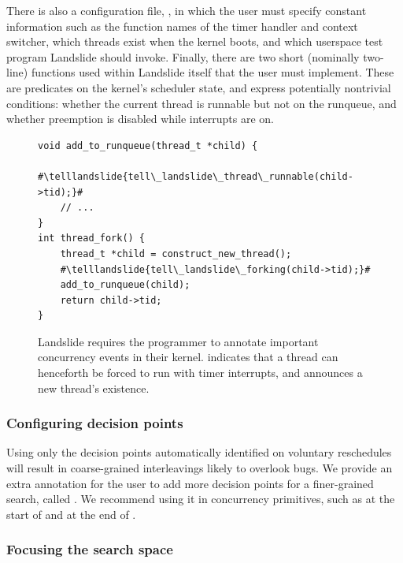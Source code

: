 There is also a configuration file, , in which the user must specify constant information such as the function names of the timer handler and context switcher, which threads exist when the kernel boots, and which userspace test program Landslide should invoke.
Finally, there are two short (nominally two-line) functions used within Landslide itself that the user must implement. These are predicates on the kernel's scheduler state, and express potentially nontrivial conditions: whether the current thread is runnable but not on the runqueue, and whether preemption is disabled while interrupts are on.

\newcommand\telllandslide[1]{\bfseries \color{violet}{#1}}
\begin{figure}[t]
\small
\begin{lstlisting}
void add_to_runqueue(thread_t *child) {
	#\telllandslide{tell\_landslide\_thread\_runnable(child->tid);}#
	// ...
}
int thread_fork() {
	thread_t *child = construct_new_thread();
	#\telllandslide{tell\_landslide\_forking(child->tid);}#
	add_to_runqueue(child);
	return child->tid;
}
\end{lstlisting}
\caption{Landslide requires the programmer to annotate important concurrency events in their kernel.  indicates that a thread can henceforth be forced to run with timer interrupts, and  announces a new thread's existence.}
\label{fig:annotation}
\end{figure}

\subsubsection{Configuring decision points}
\label{sec:decision}

Using only the decision points automatically identified on voluntary reschedules will result in coarse-grained interleavings likely to overlook bugs.
We provide an extra annotation
for the user to add more decision points for a finer-grained search, called
.
We recommend using it in concurrency primitives, such as at the start of  and at the end of .

\subsubsection{Focusing the search space}
\label{sec:focusing}

